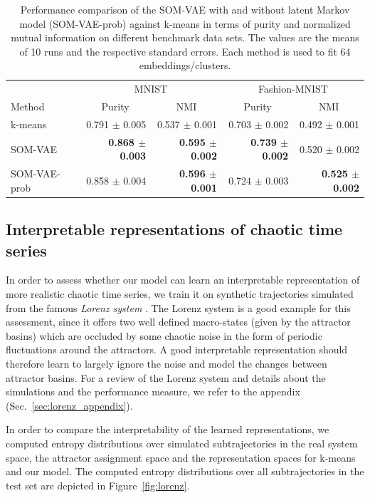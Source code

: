 \begin{table}
    \centering
    \caption{Performance comparison of the SOM-VAE with and without latent Markov model (SOM-VAE-prob) against k-means in terms of purity and normalized mutual information on different benchmark data sets. The values are the means of 10 runs and the respective standard errors. Each method is used to fit 64 embeddings/clusters.}
    \begin{tabular}{lrrrr}
        \toprule
         & \multicolumn{2}{c}{MNIST} & \multicolumn{2}{c}{Fashion-MNIST} \\
        \cmidrule(rl){2-3}
        \cmidrule(rl){4-5}
        Method & \multicolumn{1}{c}{Purity} & \multicolumn{1}{c}{NMI} & \multicolumn{1}{c}{Purity} & \multicolumn{1}{c}{NMI} \\
         \midrule
         k-means & 0.791 $\pm$ 0.005 & 0.537 $\pm$ 0.001 & 0.703 $\pm$ 0.002 & 0.492 $\pm$ 0.001 \\
         SOM-VAE & \textbf{0.868 $\pm$ 0.003} & \textbf{0.595 $\pm$ 0.002} & \textbf{0.739 $\pm$ 0.002} & 0.520 $\pm$ 0.002 \\
         SOM-VAE-prob & 0.858 $\pm$ 0.004 & \textbf{0.596 $\pm$ 0.001} & 0.724 $\pm$ 0.003 & \textbf{0.525 $\pm$ 0.002} \\
         \bottomrule
    \end{tabular}
    \label{tab:performance_prob}
\end{table}


\subsection{Interpretable representations of chaotic time series} \label{sec:lorenz}

In order to assess whether our model can learn an interpretable representation of more realistic chaotic time series, we train it on synthetic trajectories simulated from the famous \emph{Lorenz system} \citep{Lorenz1963}.
The Lorenz system is a good example for this assessment, since it offers two well defined macro-states (given by the attractor basins) which are occluded by some chaotic noise in the form of periodic fluctuations around the attractors.
A good interpretable representation should therefore learn to largely ignore the noise and model the changes between attractor basins.
For a review of the Lorenz system and details about the simulations and the performance measure, we refer to the appendix (Sec.~\ref{sec:lorenz_appendix}).

In order to compare the interpretability of the learned representations, we computed entropy distributions over simulated subtrajectories in the real system space, the attractor assignment space and the representation spaces for k-means and our model.
The computed entropy distributions over all subtrajectories in the test set are depicted in Figure~\ref{fig:lorenz}. 

